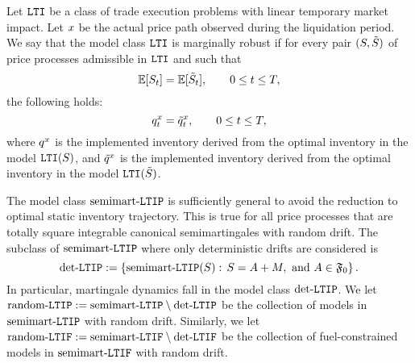 \documentclass[10pt,a4paper]{article}
\begin{document}
\begin{defi}\label{defi.marginalRobustnessForLTI}
Let $\mathtt{LTI}$ be a class of trade execution problems with linear temporary market impact. Let $x$ be the actual price path observed during the liquidation period. We say that the model class $\mathtt{LTI}$ is marginally robust if for every pair $(S,\tilde{S})$  of price processes  admissible in  $\mathtt{LTI}$ and such that 
\begin{equation*}
\mathbb{{E}} [S_{t}] = \mathbb{{E}} [\tilde{S}_t], \qquad 0\leq t \leq T,
\end{equation*}
the following holds:
\begin{equation*}
q^{x}_t = \tilde{q}^{x}_t, \qquad 0\leq t \leq T,
\end{equation*}
where $q^{x}$ is the implemented inventory derived from the optimal inventory in the model $\mathtt{LTI}(S)$, and $\tilde{q}^{x}$ is the implemented inventory derived from the optimal inventory in the model $\mathtt{LTI}(\tilde{S})$.
\end{defi}

The model class $\text{semimart-}\mathtt{LTIP}$ is sufficiently general to avoid the reduction to optimal static inventory trajectory. This is true for all price processes that are totally square integrable canonical semimartingales with random drift. The subclass of  $\text{semimart-}\mathtt{LTIP}$ where only deterministic drifts are considered is 
\begin{equation*}
\text{det-}\mathtt{LTIP} := \left\lbrace \text{semimart-}\mathtt{LTIP}(S): \, S = A + M , \text{ and } A \in \mathfrak{F}_0
\right\rbrace.
\end{equation*}
In particular, martingale dynamics fall in the model class $\text{det-}\mathtt{LTIP}$. We let $\text{random-}\mathtt{LTIP}:=\text{semimart-}\mathtt{LTIP}\setminus\text{det-}\mathtt{LTIP}$ be the collection of models in $\text{semimart-}\mathtt{LTIP}$ with random drift. Similarly, we let $\text{random-}\mathtt{LTIF}:=\text{semimart-}\mathtt{LTIF}\setminus\text{det-}\mathtt{LTIF}$ be the collection of fuel-constrained models in $\text{semimart-}\mathtt{LTIF}$ with random drift.
\end{document}
